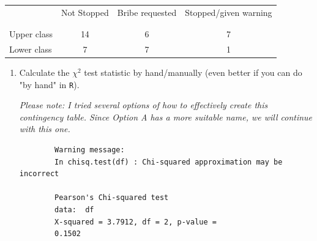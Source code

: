 \documentclass[12pt,letterpaper]{article}
\begin{document}
\begin{table}[h!]
	\centering
	\begin{tabular}{l | c c c }
		& Not Stopped & Bribe requested & Stopped/given warning \\
		\\[-1.8ex] 
		\hline \\[-1.8ex]
		Upper class & 14 & 6 & 7 \\
		Lower class & 7 & 7 & 1 \\
		\hline
	\end{tabular}
\end{table}
\newpage
\begin{enumerate}
	
	\item [(a)]
	Calculate the $\chi^2$ test statistic by hand/manually (even better if you can do "by hand" in \texttt{R}).\\
		
	
	\vspace{.25cm}
	  
	\noindent \textit{Please note: I tried several options of how to effectively create this contingency table. Since Option A has a more suitable name, we will continue with this one.}
	
	 
	 \vspace{.25cm}
	   
	\begin{verbatim}
		Warning message:
		In chisq.test(df) : Chi-squared approximation may be incorrect
		
		Pearson's Chi-squared test
		data:  df
		X-squared = 3.7912, df = 2, p-value =
		0.1502
	\end{verbatim}
	
\end{enumerate}
\end{document}
